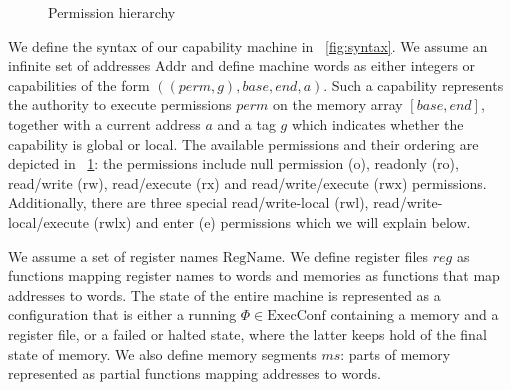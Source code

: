 \documentclass[compsoc,conference,letterpaper,fleqn]{IEEEtran}
\newcommand{\var}[1]{\mathit{#1}}
\newcommand{\hs}{\var{ms}}
\newcommand{\ms}{\hs}
\newcommand{\gl}{\var{g}}
\newcommand{\addr}{\var{a}}
\newcommand{\start}{\var{base}}
\newcommand{\addrend}{\var{end}}
\newcommand{\reg}{\var{reg}}
\newcommand{\perm}{\var{perm}}
\newcommand{\plaindom}[1]{\mathrm{#1}}
\newcommand{\Addrs}{\plaindom{Addr}}
\newcommand{\ExecConfs}{\plaindom{ExecConf}}
\newcommand{\RegName}{\plaindom{RegName}}
\newcommand{\plainperm}[1]{\mathrm{#1}}
\newcommand{\noperm}{\plainperm{o}}
\newcommand{\readonly}{\plainperm{ro}}
\newcommand{\readwrite}{\plainperm{rw}}
\newcommand{\exec}{\plainperm{rx}}
\newcommand{\entry}{\plainperm{e}}
\newcommand{\rwx}{\plainperm{rwx}}
\newcommand{\readwritel}{\plainperm{rwl}}
\newcommand{\rwlx}{\plainperm{rwlx}}
\begin{document}
\begin{figure}
  \centering

  \caption{Permission hierarchy}
  \label{fig:perm-hier}
\end{figure}

We define the syntax of our capability machine in \figurename~\ref{fig:syntax}. We
assume an infinite set of addresses $\Addrs$ and define machine words as either
integers or capabilities of the form $((\perm,\gl),\start,\addrend,\addr)$. Such
a capability represents the authority to execute permissions $\perm$ on the
memory array $[\start,\addrend]$, together with a current address $\addr$ and a
tag $\gl$ which indicates whether the capability is global or local. The
available permissions and their ordering are depicted in
\figurename~\ref{fig:perm-hier}: the permissions include null permission ($\noperm$),
readonly ($\readonly$), read/write ($\readwrite$), read/execute ($\exec$) and
read/write/execute ($\rwx$) permissions. Additionally, there are three special
read/write-local ($\readwritel$), read/write-local/execute ($\rwlx$) and enter
($\entry$) permissions which we will explain below.

We assume a set of register names $\RegName$. We define register files $\reg$ as
functions mapping register names to words and memories as functions that map
addresses to words. The state of the entire machine is represented as a
configuration that is either a running $\Phi \in \ExecConfs$ containing a memory
and a register file, or a failed or halted state, where the latter keeps hold
of the final state of memory. We also define memory segments $\ms$:
parts of memory represented as partial functions mapping addresses to words.
\end{document}
